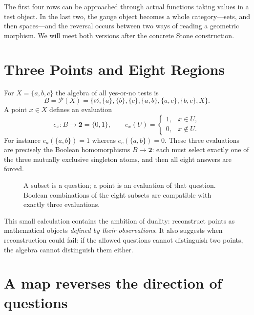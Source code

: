 The first four rows can be approached through actual functions taking values in a test object. In the last two, the gauge object becomes a whole category---sets, and then spaces---and the reversal occurs between two ways of reading a geometric morphism. We will meet both versions after the concrete Stone construction.

\section{Three Points and Eight Regions}

For $X=\{a,b,c\}$ the algebra of all yes-or-no tests is
\[
 B=\mathcal P(X)
 =\{\varnothing,\{a\},\{b\},\{c\},
       \{a,b\},\{a,c\},\{b,c\},X\}.
\]
A point $x\in X$ defines an evaluation
\[
 e_x:B\longrightarrow\mathbf2=\{0,1\},
 \qquad e_x(U)=
 \begin{cases}1,&x\in U,\\0,&x\notin U.\end{cases}
\]
For instance $e_a(\{a,b\})=1$ whereas $e_c(\{a,b\})=0$. These three evaluations are precisely the Boolean homomorphisms $B\to\mathbf2$: each must select exactly one of the three mutually exclusive singleton atoms, and then all eight answers are forced.

\begin{figure}[H]
\centering
{}
\caption{A subset is a question; a point is an evaluation of that question. Boolean combinations of the eight subsets are compatible with exactly three evaluations.}
\end{figure}

This small calculation contains the ambition of duality: reconstruct points as mathematical objects \emph{defined by their observations}. It also suggests when reconstruction could fail: if the allowed questions cannot distinguish two points, the algebra cannot distinguish them either.


\section{A map reverses the direction of questions}

